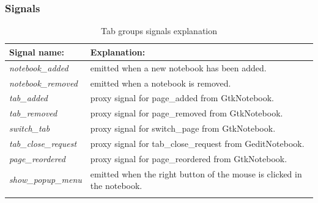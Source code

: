 \subsubsection{Signals}

\begin{table}[H]
  \begin{center}
    \begin{tabularx}{\textwidth}{|l|X|}
      \firsthline
      \textbf{Signal name:} & \textbf{Explanation:} \\
      \hline
      \textit{notebook\_added} & emitted when a new notebook has been added. \\
      \hline
      \textit{notebook\_removed} & emitted when a notebook is removed. \\
      \hline
      \textit{tab\_added} & proxy signal for page\_added from GtkNotebook. \\
      \hline
      \textit{tab\_removed} & proxy signal for page\_removed from GtkNotebook. \\
      \hline
      \textit{switch\_tab} & proxy signal for switch\_page from GtkNotebook. \\
      \hline
      \textit{tab\_close\_request} & proxy signal for tab\_close\_request from GeditNotebook. \\
      \hline
      \textit{page\_reordered} & proxy signal for page\_reordered from GtkNotebook. \\
      \hline
      \textit{show\_popup\_menu} & emitted when the right button of the mouse is clicked in the notebook. \\
      \lasthline
    \end{tabularx}
    \caption{Tab groups signals explanation}
  \end{center}
\end{table}

